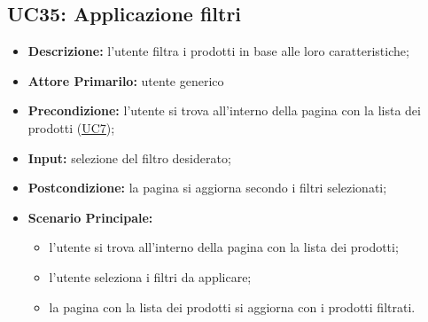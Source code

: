 \subsection{UC35: Applicazione filtri}
\label{sec:UC35}
\begin{itemize}
    \item \textbf{Descrizione:} l'utente filtra i prodotti in base alle loro caratteristiche;
    \item \textbf{Attore Primarilo:} utente generico
    \item \textbf{Precondizione:} l'utente si trova all'interno della pagina con la lista dei prodotti (\hyperref[sec:UC7]{\underline{UC7}});
    \item \textbf{Input:} selezione del filtro desiderato;
    \item \textbf{Postcondizione:} la pagina si aggiorna secondo i filtri selezionati;
    \item \textbf{Scenario Principale:}
          \begin{itemize}
              \item l'utente si trova all'interno della pagina con la lista dei prodotti;
              \item l'utente seleziona i filtri da applicare;
              \item la pagina con la lista dei prodotti si aggiorna con i prodotti filtrati.
          \end{itemize}
\end{itemize}